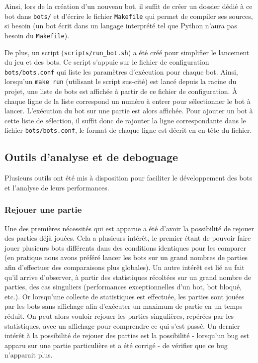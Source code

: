 \documentclass[a4paper,12pt]{article}
\begin{document}
Ainsi, lors de la création d'un nouveau bot, il suffit de créer un dossier
dédié à ce bot dans \verb!bots/! et d'écrire le fichier \verb!Makefile! qui
permet de compiler ses sources, si besoin (un bot écrit dans un
langage interprété tel que Python n'aura pas besoin du \verb!Makefile!).

De plus, un script (\verb!scripts/run_bot.sh!) a été créé pour simplifier le
lancement du jeu et des bots. Ce script s'appuie sur le fichier de configuration
\verb!bots/bots.conf! qui liste les paramètres d'exécution pour chaque bot.
Ainsi, lorsqu'un \verb!make run! (utilisant le script sus-cité) est lancé
depuis la racine du projet, une liste de bots est affichée à partir de ce
fichier de configuration. À chaque ligne de la liste correspond un numéro à
entrer pour sélectionner le bot à lancer. L'exécution du bot sur une partie
est alors affichée. Pour ajouter un bot à cette liste de sélection, il suffit
donc de rajouter la ligne correspondante dans le fichier \verb!bots/bots.conf!, 
le format de chaque ligne est décrit en en-tête du fichier.

\subsection{Outils d'analyse et de deboguage}

Plusieurs outils ont été mis à disposition pour faciliter le développement des
bots et l'analyse de leurs performances.

\subsubsection{Rejouer une partie}

Une des premières nécessités qui est apparue a été d'avoir la possibilité de
rejouer des parties déjà jouées. Cela a plusieurs intérêt, le premier étant de
pouvoir faire jouer plusieurs bots différents dans des conditions identiques
pour les comparer (en pratique nous avons préféré lancer les bots sur un grand
nombres de parties afin d'effectuer des comparaisons plus globales). Un autre
intérêt est lié au fait qu'il arrive d'observer, à partir des statistiques
récoltées sur un grand nombre de parties, des cas singuliers (performances
exceptionnelles d'un bot, bot bloqué, etc.). Or lorsqu'une collecte de
statistiques est effectuée, les parties sont jouées par les bots sans
affichage afin d'exécuter un maximum de partie en un temps réduit. On peut
alors vouloir rejouer les parties singulières, repérées par les statistiques,
avec un affichage pour comprendre ce qui s'est passé. Un dernier intérêt à la
possibilité de rejouer des parties est la possibilité - lorsqu'un bug est
apparu sur une partie particulière et a été corrigé - de vérifier que ce bug
n'apparait plus.
\end{document}
